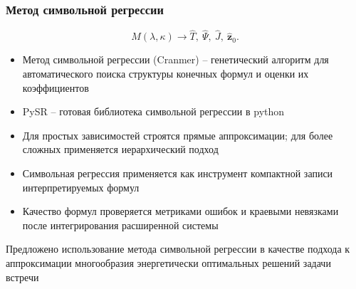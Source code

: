 \begin{frame}
    \frametitle{Метод символьной регрессии}
    \presentationtextsize
    \[
    M(\lambda,\kappa)
    \longrightarrow
    \widehat T,\ \widehat\Psi,\ \widehat J,\ \widehat{\mathbf z}_0.
    \]
    \begin{itemize}
        \item Метод символьной регрессии (Cranmer) -- генетический алгоритм для автоматического поиска структуры конечных формул и оценки их коэффициентов 
        \item PySR -- готовая библиотека символьной регрессии в python 
        \item Для простых зависимостей строятся прямые аппроксимации; для более сложных применяется иерархический подход
        \item Символьная регрессия применяется как инструмент компактной записи интерпретируемых формул
        \item Качество формул проверяется метриками ошибок и краевыми невязками после интегрирования расширенной системы
    \end{itemize}
    
    \begin{newresult}
        Предложено использование метода символьной регрессии в качестве подхода к аппроксимации многообразия энергетически оптимальных решений задачи встречи
    \end{newresult}
\end{frame}
